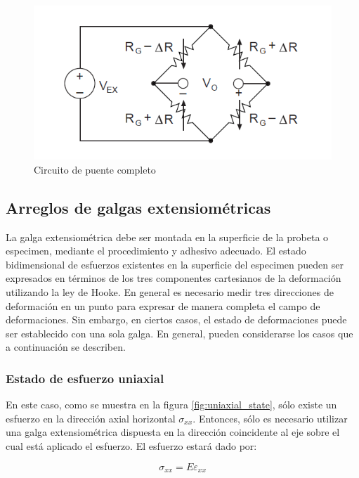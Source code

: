 \begin{figure}[H]
\centering
\includegraphics[scale=0.65]{src/ch2/full_bridge.png}
\caption{Circuito de puente completo}
\label{fig:full_bridge}
\end{figure}


\subsection{Arreglos de galgas extensiométricas}

La galga extensiométrica debe ser montada en la superficie de la probeta o 
especimen, mediante el procedimiento y adhesivo adecuado. El estado bidimensional 
de esfuerzos existentes en la superficie del especimen pueden ser expresados en 
términos de los tres componentes cartesianos de la deformación utilizando la 
ley de Hooke. En general es necesario medir tres direcciones de deformación 
en un punto para expresar de manera completa el campo de deformaciones. Sin 
embargo, en ciertos casos, el estado de deformaciones puede ser establecido 
con una sola galga. En general, pueden considerarse los casos que a continuación 
se describen.

\subsubsection*{Estado de esfuerzo uniaxial}

En este caso, como se muestra en la figura \ref{fig:uniaxial_state}, sólo existe un 
esfuerzo en la dirección axial horizontal $\sigma_{xx}$. Entonces, sólo es necesario 
utilizar una galga extensiométrica dispuesta en la dirección coincidente al eje 
sobre el cual está aplicado el esfuerzo. El esfuerzo estará dado por:

\begin{equation}
\sigma_{xx} = E \varepsilon_{xx}
\end{equation}

